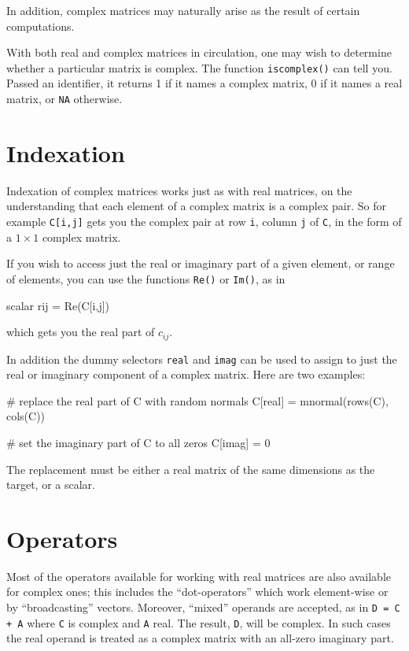\documentclass{article}
\begin{document}
In addition, complex matrices may naturally arise as the result of
certain computations.

With both real and complex matrices in circulation, one may wish to
determine whether a particular matrix is complex. The function
\texttt{iscomplex()} can tell you. Passed an identifier, it returns 1
if it names a complex matrix, 0 if it names a real matrix, or
\texttt{NA} otherwise.

\section{Indexation}

Indexation of complex matrices works just as with real matrices, on
the understanding that each element of a complex matrix is a complex
pair. So for example \texttt{C[i,j]} gets you the complex pair at row
\texttt{i}, column \texttt{j} of \texttt{C}, in the form of a
$1 \times 1$ complex matrix.

If you wish to access just the real or imaginary part of a given
element, or range of elements, you can use the functions \texttt{Re()}
or \texttt{Im()}, as in
\begin{code}
scalar rij = Re(C[i,j])
\end{code}
which gets you the real part of $c_{ij}$.

In addition the dummy selectors \texttt{real} and \texttt{imag} can be
used to assign to just the real or imaginary component of a complex
matrix. Here are two examples:
\begin{code}
# replace the real part of C with random normals
C[real] = mnormal(rows(C), cols(C))

# set the imaginary part of C to all zeros
C[imag] = 0
\end{code}
The replacement must be either a real matrix of the same dimensions as
the target, or a scalar.

\section{Operators}
\label{sec:ops}

Most of the operators available for working with real matrices are
also available for complex ones; this includes the ``dot-operators''
which work element-wise or by ``broadcasting'' vectors. Moreover,
``mixed'' operands are accepted, as in \texttt{D = C + A} where
\texttt{C} is complex and \texttt{A} real. The result, \texttt{D},
will be complex. In such cases the real operand is treated as a
complex matrix with an all-zero imaginary part.
\end{document}
